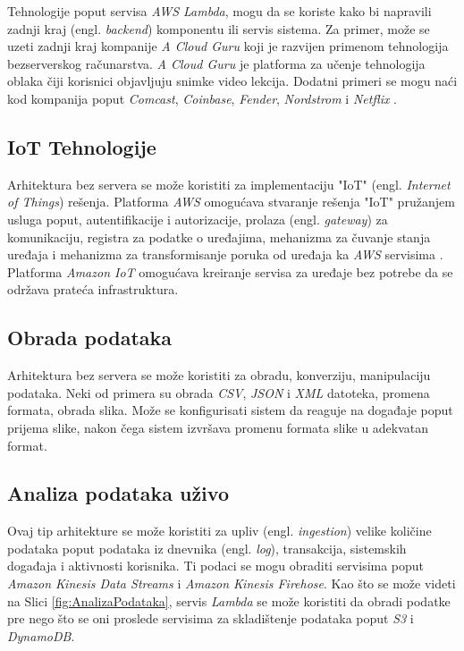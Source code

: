 \documentclass[12pt,oneside]{memoir}
\begin{document}
Tehnologije poput servisa \emph{AWS Lambda}, mogu da se koriste kako bi napravili zadnji kraj (engl. \emph{backend}) komponentu ili servis sistema. Za primer, može se uzeti zadnji kraj kompanije \emph{A Cloud Guru} koji je razvijen primenom tehnologija bezserverskog računarstva. \emph{A Cloud Guru} je platforma za učenje tehnologija oblaka čiji korisnici objavljuju snimke video lekcija. Dodatni primeri se mogu naći kod kompanija poput \emph{Comcast}, \emph{Coinbase}, \emph{Fender}, \emph{Nordstrom} i \emph{Netflix} \cite{ascs}.

\subsection{IoT Tehnologije}

Arhitektura bez servera se može koristiti za implementaciju "IoT" (engl. \emph{Internet of Things}) rešenja. Platforma \emph{AWS} omogućava stvaranje rešenja "IoT" pružanjem usluga poput, autentifikacije i autorizacije, prolaza (engl. \emph{gateway}) za komunikaciju, registra za podatke o uređajima, mehanizma za čuvanje stanja uređaja i mehanizma za transformisanje poruka od uređaja ka \emph{AWS} servisima \cite{aicf}. Platforma \emph{Amazon IoT} omogućava kreiranje servisa za uređaje bez potrebe da se održava prateća infrastruktura.

\subsection{Obrada podataka}
Arhitektura bez servera se može koristiti za obradu, konverziju, manipulaciju podataka. Neki od primera su obrada \emph{CSV}, \emph{JSON} i \emph{XML} datoteka, promena formata, obrada slika. Može se konfigurisati sistem da reaguje na događaje poput prijema slike, nakon čega sistem izvršava promenu formata slike u adekvatan format.

\subsection{Analiza podataka uživo}
Ovaj tip arhitekture se može koristiti za upliv (engl. \emph{ingestion}) velike količine podataka poput podataka iz dnevnika (engl. \emph{log}), transakcija, sistemskih događaja i aktivnosti korisnika. Ti podaci se mogu obraditi servisima poput \emph{Amazon Kinesis Data Streams} i \emph{Amazon Kinesis Firehose}. Kao što se može videti na Slici \ref{fig:AnalizaPodataka}, servis \emph{Lambda} se može koristiti da obradi podatke pre nego što se oni proslede servisima za skladištenje podataka poput \emph{S3} i \emph{DynamoDB}.
\end{document}
